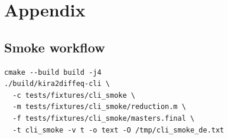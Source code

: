 \documentclass[11pt,openany]{report}
\begin{document}
\chapter{Appendix}
\section{Smoke workflow}
\begin{verbatim}
cmake --build build -j4
./build/kira2diffeq-cli \
  -c tests/fixtures/cli_smoke \
  -m tests/fixtures/cli_smoke/reduction.m \
  -f tests/fixtures/cli_smoke/masters.final \
  -t cli_smoke -v t -o text -O /tmp/cli_smoke_de.txt
\end{verbatim}
\end{document}
